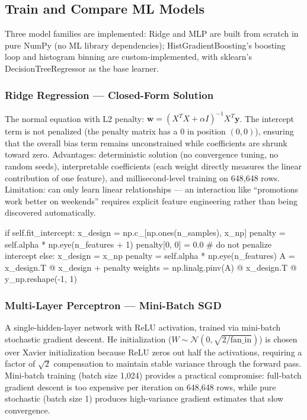 \subsection{Train and Compare ML Models}

Three model families are implemented: Ridge and MLP are built from scratch in pure NumPy (no ML library dependencies); HistGradientBoosting's boosting loop and histogram binning are custom-implemented, with sklearn's DecisionTreeRegressor as the base learner.

\subsubsection{Ridge Regression — Closed-Form Solution}
The normal equation with L2 penalty: $\mathbf{w} = (X^TX + \alpha I)^{-1}X^T\mathbf{y}$. The intercept term is not penalized (the penalty matrix has a 0 in position $(0,0)$), ensuring that the overall bias term remains unconstrained while coefficients are shrunk toward zero. Advantages: deterministic solution (no convergence tuning, no random seeds), interpretable coefficients (each weight directly measures the linear contribution of one feature), and millisecond-level training on 648,648 rows. Limitation: can only learn linear relationships — an interaction like ``promotions work better on weekends'' requires explicit feature engineering rather than being discovered automatically.

\begin{pythoncode}[caption={Ridge Regression: closed-form normal equation with intercept protection}]
if self.fit_intercept:
    x_design = np.c_[np.ones(n_samples), x_np]
    penalty = self.alpha * np.eye(n_features + 1)
    penalty[0, 0] = 0.0    # do not penalize intercept
else:
    x_design = x_np
    penalty = self.alpha * np.eye(n_features)
A = x_design.T @ x_design + penalty
weights = np.linalg.pinv(A) @ x_design.T @ y_np.reshape(-1, 1)
\end{pythoncode}

\subsubsection{Multi-Layer Perceptron — Mini-Batch SGD}
A single-hidden-layer network with ReLU activation, trained via mini-batch stochastic gradient descent. He initialization ($W \sim \mathcal{N}(0, \sqrt{2/\text{fan\_in}})$) is chosen over Xavier initialization because ReLU zeros out half the activations, requiring a factor of $\sqrt{2}$ compensation to maintain stable variance through the forward pass. Mini-batch training (batch size 1,024) provides a practical compromise: full-batch gradient descent is too expensive per iteration on 648,648 rows, while pure stochastic (batch size 1) produces high-variance gradient estimates that slow convergence.

